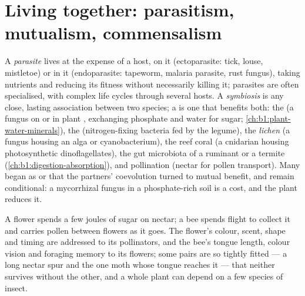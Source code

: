 \section{Living together: parasitism, mutualism, commensalism}

\begin{definition}\label{def:b1:species-interactions:symbiosis}
A \emph{parasite} lives at the expense of a host, on it (ectoparasite:
tick, louse, mistletoe) or in it (endoparasite: tapeworm, malaria
parasite, rust fungus), taking nutrients and reducing its fitness
without necessarily killing it; parasites are often specialised,
with complex life cycles through several hosts. A \emph{symbiosis} is
any close, lasting association between two species; a \emph{}
is one that benefits both: the  (a fungus on or in
plant , exchanging phosphate and water for sugar;
\cref{ch:b1:plant-water-minerals}), the  (nitrogen-fixing
bacteria fed by the legume), the \emph{lichen} (a fungus housing an
alga or cyanobacterium), the reef coral (a cnidarian housing
photosynthetic dinoflagellates), the gut microbiota of a ruminant or
a termite (\cref{ch:b1:digestion-absorption}), and pollination (nectar
for pollen transport). Many  began as  or
 that the partners' coevolution turned to mutual benefit,
and remain conditional: a mycorrhizal fungus in a phosphate-rich soil
is a cost, and the plant reduces it.
\end{definition}

\begin{example}\label{ex:b1:species-interactions:pollination}
A flower spends a few joules of sugar on nectar; a bee spends flight
to collect it and carries pollen between flowers as it goes. The
flower's colour, scent, shape and timing are addressed to its
pollinators, and the bee's tongue length, colour vision and foraging
memory to its flowers; some pairs are so tightly fitted --- a long
nectar spur and the one moth whose tongue reaches it --- that neither
survives without the other, and a whole plant  can depend on
a few species of insect.
\end{example}

